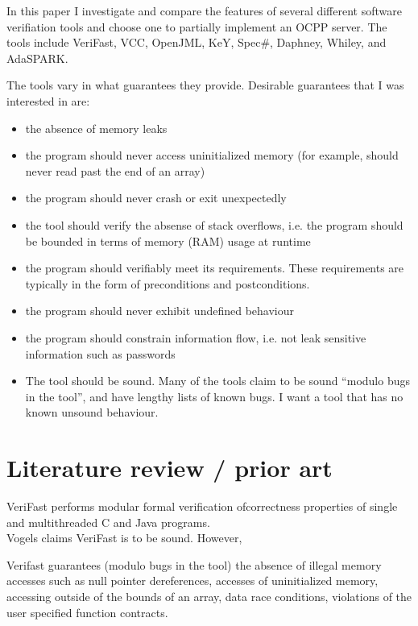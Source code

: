 \documentclass[12pt,openany,a4paper]{book}
\begin{document}
 
In this paper I investigate and compare the features of several different software verifiation tools and choose one to partially implement an OCPP server. The tools include VeriFast, VCC, OpenJML, KeY, Spec\#, Daphney, Whiley, and AdaSPARK.

The tools vary in what guarantees they provide. Desirable guarantees that I was interested in are: 
\begin{itemize}
	\item the absence of memory leaks
	\item the program should never access uninitialized memory (for example, should never read past the end of an array)
	\item the program should never crash or exit unexpectedly
	\item the tool should verify the absense of stack overflows, i.e. the program should be bounded in terms of memory (RAM) usage at runtime
	\item the program should verifiably meet its requirements. These requirements are typically in the form of preconditions and postconditions.
	\item the program should never exhibit undefined behaviour
	\item the program should constrain information flow, i.e. not leak sensitive information such as passwords
	\item The tool should be sound. Many of the tools claim to be sound ``modulo bugs in the tool'', and have lengthy lists of known bugs. I want a tool that has no known unsound behaviour.

\end{itemize}

\chapter{Literature review / prior art}
VeriFast performs modular formal verification ofcorrectness properties of single and multithreaded C and Java programs. \\


Vogels claims VeriFast is to be sound. However, 

Verifast guarantees (modulo bugs in the tool) the absence of illegal memory accesses such as null pointer dereferences, accesses of uninitialized memory, accessing outside of the bounds of an array, data race conditions, violations of the user specified function contracts.
\end{document}
